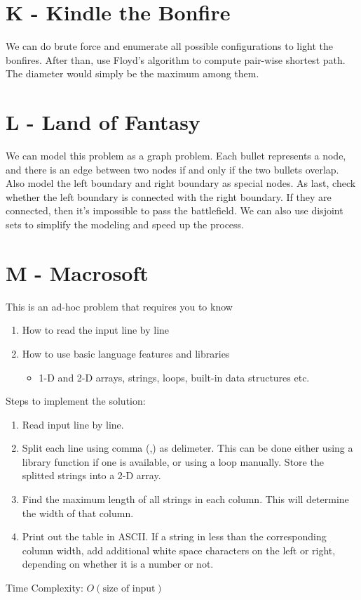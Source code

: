 \documentclass{article}
\begin{document}
\section*{K - Kindle the Bonfire}
We can do brute force and enumerate all possible configurations to light the bonfires. After than, use Floyd's algorithm to compute pair-wise shortest path. The diameter would simply be the maximum among them.


\section*{L - Land of Fantasy}
We can model this problem as a graph problem. Each bullet represents a node, and there is an edge between two nodes if and only if the two bullets overlap. Also model the left
boundary and right boundary as special nodes. As last, check whether the left boundary is connected with the right boundary. If they are connected, then it's impossible to pass the battlefield. We can also use disjoint sets to simplify the modeling and speed up the process.

\section*{M - Macrosoft}
This is an ad-hoc problem that requires you to know
\begin{enumerate}
\item How to read the input line by line
\item How to use basic language features and libraries
\begin{itemize}
\item 1-D and 2-D arrays, strings, loops, built-in data structures etc.
\end{itemize}
\end{enumerate}
Steps to implement the solution:
\begin{enumerate}
\item Read input line by line.
\item Split each line using comma (,) as delimeter. This can be done either using a library function if one is available, or using a loop manually. Store the splitted strings into a 2-D array. 
\item Find the maximum length of all strings in each column. This will determine the width of that column.
\item Print out the table in ASCII. If a string in less than the corresponding column width, add additional white space characters on the left or right, depending on whether it is a number or not.
\end{enumerate}
Time Complexity: $O(\text{size of input})$
\end{document}
